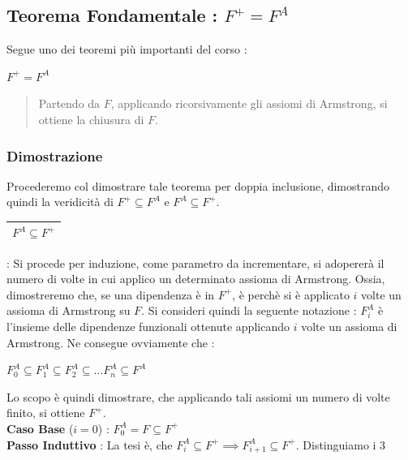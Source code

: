 \documentclass[12pt, letterpaper]{article}
\begin{document}
\subsection{Teorema Fondamentale : \(F^+=F^A\)}
Segue uno dei teoremi più importanti del corso :\begin{center}
    \(F^+=F^A\)
\end{center}
\begin{quote}Partendo da \(F\), applicando ricorsivamente gli assiomi di Armstrong, si ottiene la chiusura di \(F\).\end{quote} \subsubsection{Dimostrazione}
Procederemo col dimostrare tale teorema per doppia inclusione, dimostrando quindi la veridicità di \(F^+\subseteq F^A\) e \(F^A\subseteq F^+\).
\\\begin{tabular}{|c|}\hline \(F^A\subseteq F^+\) \\ \hline\end{tabular}: Si procede per induzione, come parametro da 
incrementare, si adopererà il numero di volte in cui applico un determinato assioma di Armstrong. Ossia, dimostreremo che, 
se una dipendenza è in \(F^+\), è perchè si è applicato \(i\) volte un assioma di Armstrong su \(F\). Si consideri quindi 
la seguente notazione : \(F^A_i\) è l'insieme delle dipendenze funzionali ottenute applicando \(i\) volte un assioma di Armstrong.
Ne consegue ovviamente che : \begin{center}
    \(F^A_0\subseteq F^A_1\subseteq F^A_2\subseteq... F^A_n\subseteq F^A\)\end{center}
Lo scopo è quindi dimostrare, che applicando tali assiomi un numero di volte finito, si ottiene \(F^+\).\\
\textbf{Caso Base } (\(i=0\)) : \(F_0^A=F\subseteq F^+\) 
\\\textbf{Passo Induttivo } : La tesi è, che \(F_i^A\subseteq F^+\implies F_{i+1}^A\subseteq F^+\). Distinguiamo i 3 
\end{document}
